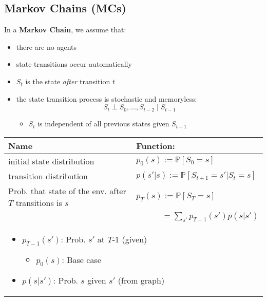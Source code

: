 \subsection{Markov Chains (MCs)}
\begin{summary}
    In a \textbf{Markov Chain}, we assume that:
    \begin{itemize}
        \item there are no agents
        \item state transitions occur automatically
        \item $S_t$ is the state \textit{after} transition $t$
        \item the state transition process is stochastic and memoryless:
        \[
        S_t \perp S_0, \dots, S_{t-2} \mid S_{t-1}
        \]
        \begin{itemize}
            \item $S_t$ is independent of all previous states given $S_{t-1}$
        \end{itemize}
    \end{itemize}
    \vspace{1em}

    \begin{center}
        \begin{tabular}{ll}
            \toprule
            \textbf{Name} & \textbf{Function:} \\
            \midrule
            initial state distribution & $p_0(s) := \mathbb{P}[S_0 = s]$ \\
            \midrule
            transition distribution & $p(s'|s) := \mathbb{P}[S_{t+1} = s' | S_t = s]$ \\
            \midrule 
            Prob. that state of the env. after $T$ transitions is $s$ & $p_T(s) := \mathbb{P}[S_T = s]$ \\
            & $\quad \quad \; \; \; \;= \sum_{s'} p_{T-1}(s') p(s|s')$ \\
            \multicolumn{2}{p{\linewidth}}{
            \begin{itemize}
                \item $p_{T-1}(s')$: Prob. $s'$ at $T$-$1$ (given) 
                \begin{itemize}
                    \item $p_0(s)$: Base case
                \end{itemize}
                \item $p(s|s')$: Prob. $s$ given $s'$ (from graph)
            \end{itemize}} \\
            \bottomrule            
        \end{tabular}
    \end{center}
\end{summary}

